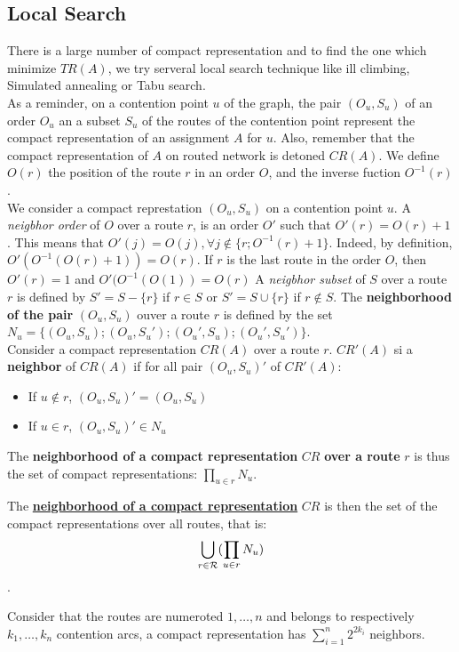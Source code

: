 \documentclass[english]{article}
\begin{document}
\subsection{Local Search}

There is a large number of compact representation and to find the one which minimize $TR(A)$, we try serveral local search technique like ill climbing, Simulated annealing or Tabu search.\\

As a reminder, on a contention point $u$ of the graph, the pair $(O_u,S_u)$ of an order $O_u$ an a subset $S_u$ of the routes of the contention point represent the compact representation of an assignment $A$ for $u$.
 Also, remember that the compact representation of $A$ on routed network is detoned $CR(A)$.
We define $O(r)$ the position of the route $r$ in an order $O$, and the inverse fuction $O^{-1}(r)$.\\
We consider a compact represtation $(O_u,S_u)$ on a contention point $u$.
A \textit{neigbhor order} of  $O$ over a route $r$, is an order $O'$ such that $O'(r) = O(r)+1$ . This means that $O'(j) = O(j),\forall j \notin \{r;O^{-1}(r)+1\}$. Indeed, by definition, $O'(O^{-1}(O(r)+1)) = O(r)$. If $r$ is the last route in the order $O$, then $O'(r) = 1$ and $O'(O^{-1}(O(1))=O(r)$
A \textit{neigbhor subset} of $S$ over a route $r$ is defined by $S' = S - \{r\}$ if $r\in S$ or $S'= S \cup \{r\}$ if $ r \notin S$.
The \textbf{neighborhood of the pair} $(O_u,S_u)$ ouver a route $r$ is defined by the set $N_u = \{(O_u,S_u);(O_u,S_u');(O_u',S_u);(O_u',S_u')\}$.\\

Consider a compact representation $CR(A)$ over a route $r$.
$CR'(A)$ si a \textbf{neighbor} of $CR(A)$ if for all pair $(O_u,S_u)'$ of $CR'(A)$:
\begin{itemize}
 \item If $u \notin r$, $(O_u,S_u)' = (O_u,S_u)$
 \item If $u \in r$, $(O_u,S_u)' \in N_u $
\end{itemize}

The \textbf{neighborhood of a compact representation} $CR$ \textbf{over a route} $r$  is thus the set of compact representations: $\prod_{u\in r} N_u$.

The \textbf{\underline{neighborhood of a compact representation}} $CR$ is then the set of the compact representations over all routes, that is:
$$ \bigcup_{r\in{\cal R}} (\prod_{u\in r} N_u ) $$.

 Consider that the routes are numeroted $1,\ldots,n$ and belongs to respectively $k_1,\ldots,k_n$ contention arcs, a compact representation has $\sum_{i=1}^n 2^{2k_i} $ neighbors.
\end{document}
